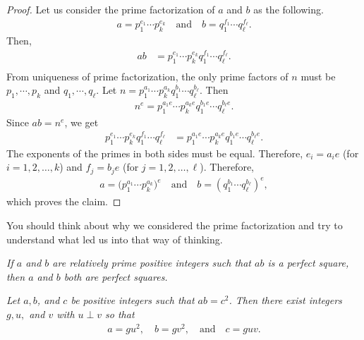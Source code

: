 \documentclass{subfile}
\begin{document}
	\begin{proof}
		Let us consider the prime factorization of $a$ and $b$ as the following.
		\begin{align*}
			a  = p_1^{e_1}\cdots p_k^{e_k}\quad \text{and} \quad b = q_1^{f_1}\cdots q_\ell^{f_\ell}.
		\end{align*}
		Then,
		\begin{align*}
			ab &= p_1^{e_1}\cdots p_k^{e_k}q_1^{f_1}\cdots q_\ell^{f_\ell}.\\
		\end{align*}
		From uniqueness of prime factorization, the only prime factors of $n$ must be $p_1,\cdots,p_k$ and $q_1,\cdots,q_\ell$. Let $n = p_1^{a_1}\cdots p_k^{a_k}q_1^{b_1}\cdots q_\ell^{b_\ell}$. Then
		\begin{align*}
			n^e  = p_1^{a_1e}\cdots p_k^{a_ke}q_1^{b_1e}\cdots q_\ell^{b_\ell e}.
		\end{align*}
		Since $ab=n^e$, we get
		\begin{align*}
			p_1^{e_1}\cdots p_k^{e_k}q_1^{f_1}\cdots q_\ell^{f_\ell} & = p_1^{a_1e}\cdots p_k^{a_ke}q_1^{b_1e}\cdots q_\ell^{b_\ell e}.
		\end{align*}
		The exponents of the primes in both sides must be equal. Therefore, $e_i=a_ie$ (for $i=1,2,\ldots,k$) and $f_j=b_je$ (for $j=1,2,\ldots,\ell$). Therefore,
		\begin{align*}
			a = \Big(p_1^{a_1}\cdots p_k^{a_k}\Big)^e \quad \text{and} \quad b = \left(q_1^{b_1}\cdots q_\ell^{b_\ell}\right)^e,
		\end{align*}
		which proves the claim.
	\end{proof}

	\begin{note}
		You should think about why we considered the prime factorization and try to understand what led us into that way of thinking.
	\end{note}

	\begin{corollary}\slshape
		If $a$ and $b$ are relatively prime positive integers such that $ab$ is a perfect square, then $a$ and $b$ both are perfect squares.\label{cor:sqr}
	\end{corollary}

	\begin{theorem}\slshape
		Let $a,b$, and $c$ be positive integers such that $ab=c^2$. Then there exist integers $g,u,$ and $v$ with $u\perp v$ so that
		\begin{align*}
			a = gu^2,\quad b = gv^2, \quad \text{and} \quad c = guv.
		\end{align*}
	\end{theorem}
\end{document}
